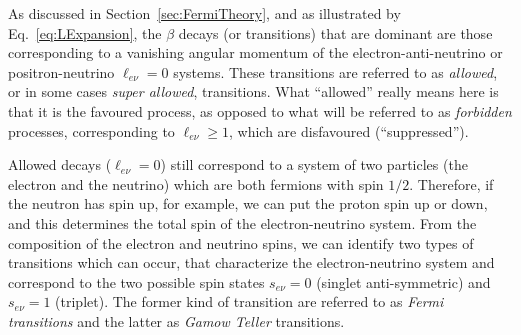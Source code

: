 As discussed in Section~\ref{sec:FermiTheory}, and as illustrated by Eq.~\eqref{eq:LExpansion}, the $\beta$ decays (or transitions) that are dominant are those corresponding to a vanishing angular momentum of the electron-anti-neutrino or positron-neutrino $\ell_{e\nu} = 0$ systems. These transitions are referred to as \emph{ allowed}, or in some cases \emph{ super allowed}, transitions. %
What ``allowed'' really means here is that it is the favoured process, as opposed to what will be referred to as  \emph{ forbidden} processes, corresponding to  $\ell_{e\nu} \geq 1$, which are disfavoured (``suppressed'').

Allowed decays ($\ell_{e\nu} = 0$) still correspond to a system of two particles (the electron and the neutrino) which are both fermions with spin \(1/2\). Therefore, if the neutron has spin up, for example, we can put the proton spin up or down, and this determines the total spin of the electron-neutrino system. From the composition of the electron and neutrino spins, we can identify two types of transitions which can occur, that characterize the electron-neutrino system and correspond to the two possible spin states $s_{e\nu} = 0$ (singlet anti-symmetric) and $s_{e\nu} = 1$ (triplet). The former kind of transition are referred to as \emph{Fermi transitions} and the latter as \emph{Gamow Teller} transitions. 

